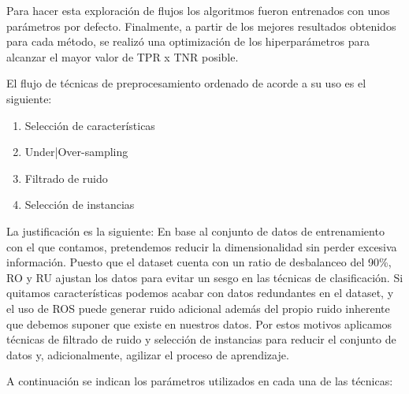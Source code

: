 Para hacer esta exploración de flujos los algoritmos fueron entrenados con unos parámetros por defecto. Finalmente, a partir de los mejores resultados obtenidos para cada método, se realizó una optimización de los hiperparámetros para alcanzar el mayor valor de TPR x TNR posible.

\vspace{\baselineskip}

El flujo de técnicas de preprocesamiento ordenado de acorde a su uso es el siguiente:
\begin{enumerate}
    \item Selección de características
    \item Under|Over-sampling
    \item Filtrado de ruido
    \item Selección de instancias
\end{enumerate}

\vspace{\baselineskip}

La justificación es la siguiente: En base al conjunto de datos de entrenamiento con el que contamos, pretendemos reducir la dimensionalidad sin perder excesiva información. Puesto que el dataset cuenta con un ratio de desbalanceo del 90\%, RO y RU ajustan los datos para evitar un sesgo en las técnicas de clasificación. Si quitamos características podemos acabar con datos redundantes en el dataset, y el uso de ROS puede generar ruido adicional además del propio ruido inherente que debemos suponer que existe en nuestros datos. Por estos motivos aplicamos técnicas de filtrado de ruido y selección de instancias para reducir el conjunto de datos y, adicionalmente, agilizar el proceso de aprendizaje. 

\vspace{\baselineskip}

A continuación se indican los parámetros utilizados en cada una de las técnicas:

